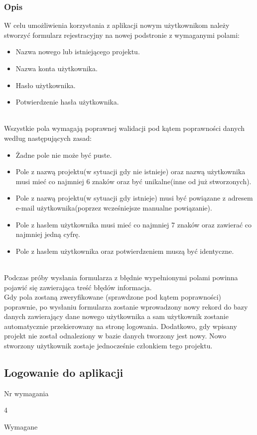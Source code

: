 \documentclass[eng,printmode]{mgr}
\begin{document}
\subsubsection{Opis}
W celu umożliwienia korzystania z aplikacji nowym użytkownikom należy stworzyć formularz rejestracyjny na nowej podstronie z wymaganymi polami:
\begin{itemize}
	\item[--] Nazwa nowego lub istniejącego projektu.
	\item[--] Nazwa konta użytkownika.
	\item[--] Hasło użytkownika.
	\item[--] Potwierdzenie hasła użytkownika.
\end{itemize}
\ \\
Wszystkie pola wymagają poprawnej walidacji pod kątem poprawności danych według następujących zasad:
\begin{itemize}
	\item[--] Żadne pole nie może być puste.
	\item[--] Pole z nazwą projektu(w sytuacji gdy nie istnieje) oraz nazwą użytkownika musi mieć co najmniej 6 znaków oraz być unikalne(inne od już stworzonych).
	\item[--] Pole z nazwą projektu(w sytuacji gdy istnieje) musi być powiązane z adresem e-mail użytkownika(poprzez wcześniejsze manualne powiązanie).
	\item[--] Pole z hasłem użytkownika musi mieć co najmniej 7 znaków oraz zawierać co najmniej jedną cyfrę.
	\item[--] Pole z hasłem użytkownika oraz potwierdzeniem muszą być identyczne.
\end{itemize}
\ \\
Podczas próby wysłania formularza z błędnie wypełnionymi polami powinna pojawić się zawierająca treść błędów informacja.
\\
Gdy pola zostaną zweryfikowane (sprawdzone pod kątem poprawności) poprawnie, po wysłaniu formularza zostanie wprowadzony nowy rekord do bazy danych zawierający dane nowego użytkownika a sam użytkownik zostanie automatycznie przekierowany na stronę logowania. Dodatkowo, gdy wpisany projekt nie został odnaleziony w bazie danych tworzony jest nowy. Nowo stworzony użytkownik zostaje jednocześnie członkiem tego projektu.

\subsection{Logowanie do aplikacji}
\begin{labeling}{Nr wymagania}
\item [Nr wymagania:] 4
\item [Priorytet:] Wymagane
\end{labeling}
\end{document}
